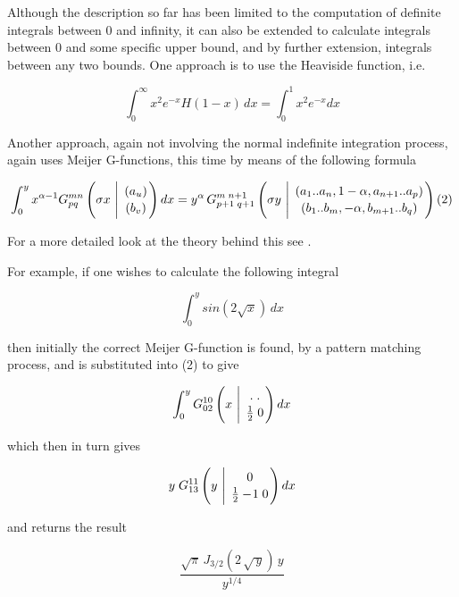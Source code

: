 Although the description so far has been limited to the computation of
definite integrals between 0 and infinity, it can also be extended to
calculate integrals between 0 and some specific upper bound, and
by further extension, integrals between any two bounds.  One approach is
to use the Heaviside function, i.e.

\begin{displaymath}
\int_{0}^{\infty} x^{2} e^{-x} H(1-x)\,dx = \int_{0}^{1} x^{2} e^{-x}dx
\end{displaymath} 

Another approach, again not involving the normal indefinite integration
process, again uses Meijer G-functions, this time by means of the
following formula

\begin{displaymath}
\int_{0}^{y} x^{\alpha-1} G^{m n}_{p q} 
\left( \sigma x \  \Bigg\vert \  {( a_u) \atop (b_v)} \right) dx=%
y^{\alpha}\,G^{m \; n+1}_{p+1 \; q+1} \left( \sigma y \  \Bigg\vert \
{( a_1..a_n,1-\alpha,a_{n+1}..a_p) 
\atop (b_1..b_m,-\alpha,b_{m+1}..b_q)} \right) (2) 
\end{displaymath}

For a more detailed look at the theory behind this see 
\cite{Adamchik:90}.

For example, if one wishes to calculate the following integral

\begin{displaymath}
\int_{0}^{y} sin(2 \sqrt{x}) \, dx 
\end{displaymath}

then initially the correct Meijer G-function is found, by a pattern 
matching process, and is substituted 
into (2) to give

\begin{displaymath}
\int_{0}^{y} G^{1 0}_{0 2}\left(x 
\ \Bigg\vert \ {. \; .  \atop \frac{1}{2} \; 0} \right) dx
\end{displaymath}

which then in turn gives

\begin{displaymath}
y \; G^{1 1}_{1 3}\left(y \ \Bigg\vert \ {0 \atop 
\frac{1}{2} -\!1 \; 0} \right) dx
\end{displaymath}

and returns the result

\begin{displaymath}
\frac{\sqrt{\pi} \, J_{3/2}(2 \, \sqrt{\,y}) \, y}{y^{1/4}}
\end{displaymath}

